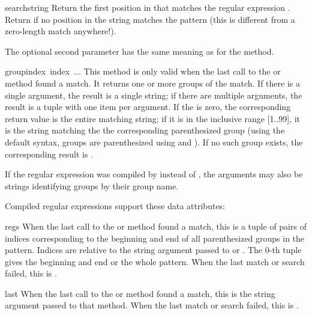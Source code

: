 \begin{funcdesc}{search}{string}
  Return the first position in  that matches the regular
  expression .  Return  if no position in the
  string matches the pattern (this is different from a zero-length
  match anywhere!).
  
  The optional second parameter has the same meaning as for the
   method.
\end{funcdesc}

\begin{funcdesc}{group}{index\, index\, ...}
This method is only valid when the last call to the 
or  method found a match.  It returns one or more
groups of the match.  If there is a single  argument,
the result is a single string; if there are multiple arguments, the
result is a tuple with one item per argument.  If the  is
zero, the corresponding return value is the entire matching string; if
it is in the inclusive range [1..99], it is the string matching the
the corresponding parenthesized group (using the default syntax,
groups are parenthesized using \code{{\e}(} and \code{{\e})}).  If no
such group exists, the corresponding result is .

If the regular expression was compiled by  instead of
, the  arguments may also be strings
identifying groups by their group name.
\end{funcdesc}

\noindent
Compiled regular expressions support these data attributes:

\renewcommand{\indexsubitem}{(regex attribute)}

\begin{datadesc}{regs}
When the last call to the  or  method found a
match, this is a tuple of pairs of indices corresponding to the
beginning and end of all parenthesized groups in the pattern.  Indices
are relative to the string argument passed to  or
.  The 0-th tuple gives the beginning and end or the
whole pattern.  When the last match or search failed, this is
.
\end{datadesc}

\begin{datadesc}{last}
When the last call to the  or  method found a
match, this is the string argument passed to that method.  When the
last match or search failed, this is .
\end{datadesc}

